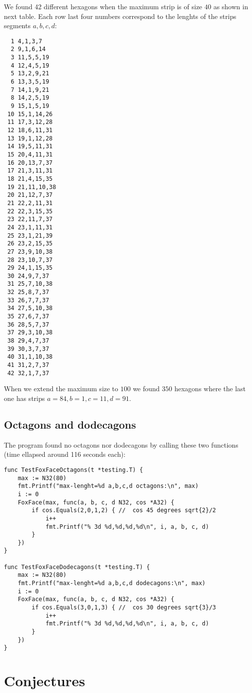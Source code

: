 \documentclass[11pt]{article}
\begin{document}
We found 42 different hexagons when the maximum strip is of size $40$ as shown in next table.
Each row last four numbers correspond to the lenghts of the strips segments $a,b,c,d$:
\setlength{\columnsep}{200pt}
\begin{multicols}{2}
\begin{lstlisting}
  1 4,1,3,7
  2 9,1,6,14
  3 11,5,5,19
  4 12,4,5,19
  5 13,2,9,21
  6 13,3,5,19
  7 14,1,9,21
  8 14,2,5,19
  9 15,1,5,19
 10 15,1,14,26
 11 17,3,12,28
 12 18,6,11,31
 13 19,1,12,28
 14 19,5,11,31
 15 20,4,11,31
 16 20,13,7,37
 17 21,3,11,31
 18 21,4,15,35
 19 21,11,10,38
 20 21,12,7,37
 21 22,2,11,31
 22 22,3,15,35
 23 22,11,7,37
 24 23,1,11,31
 25 23,1,21,39
 26 23,2,15,35
 27 23,9,10,38
 28 23,10,7,37
 29 24,1,15,35
 30 24,9,7,37
 31 25,7,10,38
 32 25,8,7,37
 33 26,7,7,37
 34 27,5,10,38
 35 27,6,7,37
 36 28,5,7,37
 37 29,3,10,38
 38 29,4,7,37
 39 30,3,7,37
 40 31,1,10,38
 41 31,2,7,37
 42 32,1,7,37
\end{lstlisting}
\end{multicols}
When we extend the maximum size to $100$ we found $350$ hexagons where the last one
has strips $a=84, b=1, c=11, d=91$.

\subsection{Octagons and dodecagons}

The program found no octagons nor dodecagons by calling these two functions (time ellapsed around 116 seconds each):
\begin{lstlisting}
func TestFoxFaceOctagons(t *testing.T) {
	max := N32(80)
	fmt.Printf("max-lenght=%d a,b,c,d octagons:\n", max)
	i := 0
	FoxFace(max, func(a, b, c, d N32, cos *A32) {
		if cos.Equals(2,0,1,2) { //  cos 45 degrees sqrt{2}/2
			i++
			fmt.Printf("% 3d %d,%d,%d,%d\n", i, a, b, c, d)
		}
	})
}

func TestFoxFaceDodecagons(t *testing.T) {
	max := N32(80)
	fmt.Printf("max-lenght=%d a,b,c,d dodecagons:\n", max)
	i := 0
	FoxFace(max, func(a, b, c, d N32, cos *A32) {
		if cos.Equals(3,0,1,3) { //  cos 30 degrees sqrt{3}/3
			i++
			fmt.Printf("% 3d %d,%d,%d,%d\n", i, a, b, c, d)
		}
	})
}
\end{lstlisting}

\section{Conjectures}
\end{document}
